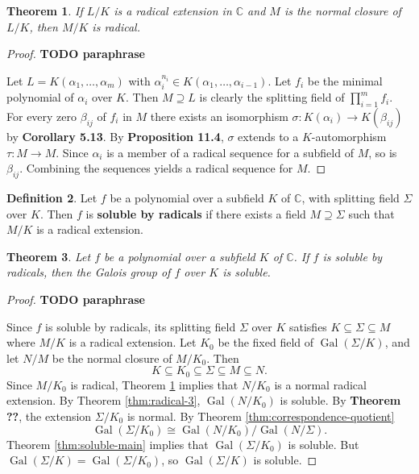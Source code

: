 \documentclass[12pt]{article}
\newtheorem{theorem}{Theorem}
\theoremstyle{definition}
\newtheorem{definition}[theorem]{Definition}
\newcommand{\Gal}{\operatorname{Gal}}
\begin{document}
\begin{theorem} \label{thm:radical-closure}
    If $L / K$ is a radical extension in $\mathbb{C}$ and $M$ is the normal closure of $L / K$, then $M / K$ is radical.
\end{theorem}

\begin{proof}
\textbf{TODO paraphrase}

Let $L=K\left(\alpha_1, \ldots, \alpha_m\right)$ with $\alpha_i^{n_i} \in K\left(\alpha_1, \ldots, \alpha_{i-1}\right)$. Let $f_i$ be the minimal polynomial of $\alpha_i$ over $K$. Then $M \supseteq L$ is clearly the splitting field of $\prod_{i=1}^m f_i$. For every zero $\beta_{i j}$ of $f_i$ in $M$ there exists an isomorphism $\sigma : K\left(\alpha_i\right) \rightarrow K\left(\beta_{i j}\right)$ by \textbf{Corollary 5.13}. By \textbf{Proposition 11.4}, $\sigma$ extends to a $K$-automorphism $\tau: M \rightarrow M$. Since $\alpha_i$ is a member of a radical sequence for a subfield of $M$, so is $\beta_{i j}$. Combining the sequences yields a radical sequence for $M$.
\end{proof}


\begin{definition}
    Let $f$ be a polynomial over a subfield $K$ of $\mathbb{C}$, with splitting field $\Sigma$ over $K$. Then $f$ is \textbf{soluble by radicals} if there exists a field $M \supseteq \Sigma$ such that $M / K$ is a radical extension.  
\end{definition}



\begin{theorem} \label{thm:radical-galois-soluble}
    Let $f$ be a polynomial over a subfield $K$ of $\mathbb{C}$. If $f$ is soluble by radicals, then the Galois group of $f$ over $K$ is soluble.
\end{theorem}

\begin{proof}
\textbf{TODO paraphrase}

Since $f$ is soluble by radicals, its splitting field $\Sigma$ over $K$ satisfies $K \subseteq \Sigma \subseteq M$ where $M / K$ is a radical extension. Let $K_0$ be the fixed field of $\Gal(\Sigma / K)$, and let $N / M$ be the normal closure of $M / K_0$. Then
$$
K \subseteq K_0 \subseteq \Sigma \subseteq M \subseteq N.
$$
Since $M / K_0$ is radical, Theorem \ref{thm:radical-closure} implies that $N / K_0$ is a normal radical extension. By Theorem \ref{thm:radical-3}, $\Gal\left(N / K_0\right)$ is soluble.
By \textbf{Theorem ??}, the extension $\Sigma / K_0$ is normal. By Theorem \ref{thm:correspondence-quotient}
$$
\Gal\left(\Sigma / K_0\right) \cong \Gal\left(N / K_0\right) / \Gal(N / \Sigma).
$$
Theorem \ref{thm:soluble-main} implies that $\Gal\left(\Sigma / K_0\right)$ is soluble. But $\Gal(\Sigma / K)=\Gal\left(\Sigma / K_0\right)$, so $\Gal(\Sigma / K)$ is soluble.

\end{proof}
\end{document}
